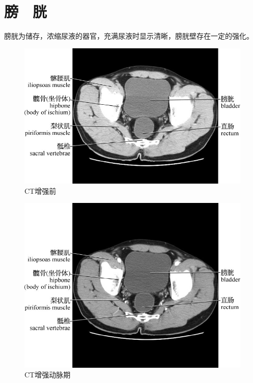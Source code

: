 \section{膀　胱}

膀胱为储存，浓缩尿液的器官，充满尿液时显示清晰，膀胱壁存在一定的强化。

\begin{figure}[!htbp]
 \centering
 \includegraphics{./images/Image00155.jpg}
 \captionsetup{justification=centering}
 \caption{CT增强前}
  \end{figure} 
 \FloatBarrier

\begin{figure}[!htbp]
 \centering
 \includegraphics{./images/Image00156.jpg}
 \captionsetup{justification=centering}
 \caption{CT增强动脉期}
  \end{figure} 
 \FloatBarrier

